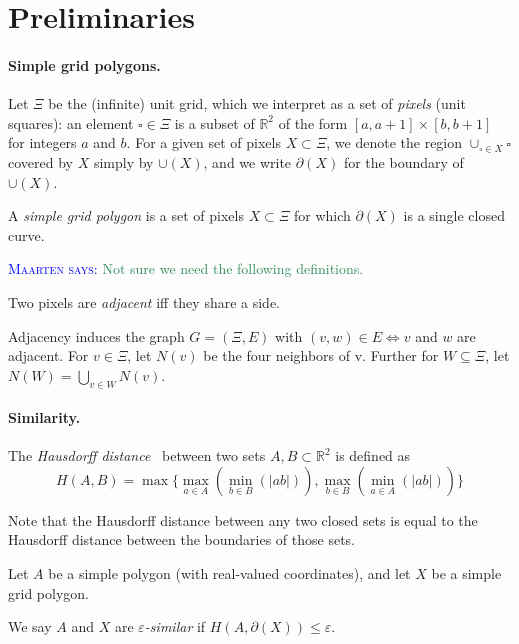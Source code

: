 \documentclass[a4paper, UKenglish]{lipics-v2018}
\newcommand{\mremark}[3]{\textcolor{blue}{\textsc{#1 #2:}} \textcolor{SeaGreen}{\textsf{#3}}}
\newcommand{\maarten}[2][says]{\mremark{Maarten}{#1}{#2}}
\newcommand{\pix}{\square}
\newcommand{\eps}{\varepsilon}
\newcommand{\R}{\mathbb{R}}
\begin{document}
\section{Preliminaries}
\label {sec:prelims}

\paragraph {Simple grid polygons.}

Let $\Xi$ be the (infinite) unit grid, which we interpret as a set of {\em pixels} (unit squares): 
an element $\pix \in \Xi$ is a subset of $\R^2$ of the form $[a,a+1]\times[b,b+1]$ for integers $a$ and $b$.
For a given set of pixels $X \subset \Xi$, we denote the region $\cup_{\pix \in X}\pix$ covered by $X$ simply by $\cup(X)$, and we write $\partial(X)$ for the boundary of $\cup(X)$.

\begin{definition}
A {\em simple grid polygon} is a set of pixels $X \subset \Xi$ for which $\partial(X)$ is a single closed curve.
\end{definition}

\maarten {Not sure we need the following definitions.}

\begin{definition}
Two pixels are \emph{adjacent} iff they share a side.
\end{definition}

Adjacency induces the graph $G=(\Xi, E)$ with $(v, w)\in E \iff v$ and $w$ are adjacent.
For $v\in \Xi$, let $N(v)$ be the four neighbors of v. Further for $W\subseteq \Xi$, let $N(W)=\bigcup_{v\in W} N(v)$.

\paragraph {Similarity.}

The {\em Hausdorff distance}~\cite{} between two sets $A, B \subset \R^2$ is defined as 
\[
  H(A, B) = \max \{\max_{a \in A}(\min_{b \in B}(|ab|)), \max_{b \in B}(\min_{a \in A}(|ab|))\}
\]

Note that the Hausdorff distance between any two closed sets is equal to the Hausdorff distance between the boundaries of those sets.

Let $A$ be a simple polygon (with real-valued coordinates), and let $X$ be a simple grid polygon.

\begin{definition}
We say $A$ and $X$ are {\em $\eps$-similar} if $H(A,\partial(X)) \le \eps$. 
\end{definition}
\end{document}
